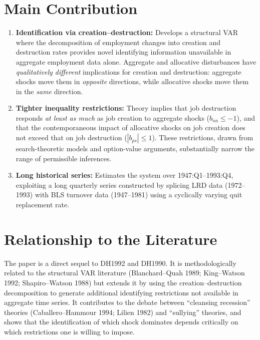\section{Main Contribution}

\begin{enumerate}
  \item \textbf{Identification via creation--destruction:} Develops a
    structural VAR where the decomposition of employment changes into creation
    and destruction rates provides novel identifying information unavailable
    in aggregate employment data alone. Aggregate and allocative disturbances
    have \emph{qualitatively different} implications for creation and
    destruction: aggregate shocks move them in \emph{opposite} directions,
    while allocative shocks move them in the \emph{same} direction.

  \item \textbf{Tighter inequality restrictions:} Theory implies that job
    destruction responds \emph{at least as much} as job creation to aggregate
    shocks ($b_{na}\leq -1$), and that the contemporaneous impact of allocative
    shocks on job creation does not exceed that on job destruction ($|b_{ps}|\leq 1$).
    These restrictions, drawn from search-theoretic models and option-value
    arguments, substantially narrow the range of permissible inferences.

  \item \textbf{Long historical series:} Estimates the system over
    1947:Q1--1993:Q4, exploiting a long quarterly series constructed by
    splicing LRD data (1972--1993) with BLS turnover data (1947--1981) using
    a cyclically varying quit replacement rate.
\end{enumerate}

\section{Relationship to the Literature}

The paper is a direct sequel to DH1992 and DH1990. It is methodologically
related to the structural VAR literature (Blanchard--Quah 1989; King--Watson
1992; Shapiro--Watson 1988) but extends it by using the creation--destruction
decomposition to generate additional identifying restrictions not available in
aggregate time series. It contributes to the debate between ``cleansing
recession'' theories (Caballero--Hammour 1994; Lilien 1982) and ``sullying''
theories, and shows that the identification of which shock dominates depends
critically on which restrictions one is willing to impose.

